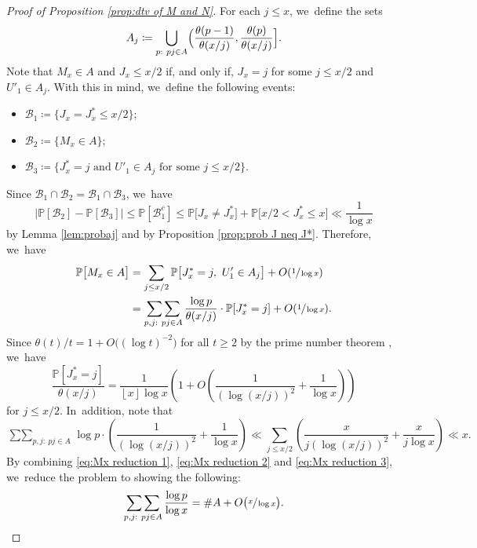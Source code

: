 \documentclass[JEP,XML,SOM,Unicode,published]{cedram}
\newcommand{\bigO}[1]{O(#1)}
\newcommand{\PP}{\mathbb{P}}
\newcommand{\BC}{\mathcal{B}}
\newcommand{\bigoo}[1]{O\!\left(#1 \right)}
\newcommand{\floor}[1]{\left\lfloor #1 \right\rfloor}
\newcommand{\bg}{\big}
\newcommand{\bgg}{\Big}
\theoremstyle{plain}
\theoremstyle{definition}
\begin{document}
\begin{proof}[Proof of Proposition \ref{prop:dtv of M and N}]
For each $j \le x$, we~define the sets
\[
A_j \coloneqq \bigcup_{\substack{p:\ pj \in A}} \Bigl(\frac{\theta(p-1)}{\theta(x/j)}, \frac{\theta(p)}{\theta(x/j)}\Bigr].
\]
Note that $M_x \in A$ and $J_x \le x/2$ if, and only if, $J_x=j$ for some $j\le x/2$ and $U'_1 \in A_j$. With this in mind, we~define the following events:
\begin{itemize}
\item $\mathcal B_1 \coloneqq \{J_x=J_x^* \le x/2\}$;
\item $\mathcal B_2 \coloneqq \{ M_x \in A\}$;
\item $\mathcal B_3 \coloneqq \{\mbox{$J_x^* = j$ and $U'_1 \in A_j$ for some $j\le x/2$}\}$.
\end{itemize}
Since $\mathcal B_1 \cap \mathcal B_2 = \mathcal B_1 \cap \mathcal B_3$, we~have
\[
\bgg|\PP[\BC_2] - \PP[\BC_3]\bgg| \le \PP[\BC_1^c] \le \PP\bg[J_x \ne J_x^*\bg] + \PP\bg[x/2< J_x^* \le x\bg] \ll \frac{1}{\log x}
\]
by Lemma \ref{lem:probaj} and by Proposition \ref{prop:prob J neq J*}. Therefore, we~have
\begin{equation}
\label{eq:Mx reduction 1}
\begin{aligned}
\PP\bg[M_x \in A\bg]
&= \sum_{j \le x/2} \PP\bg[J_x^* = j,\ U'_1 \in A_j\bg] + \bigO{\sfrac{1}{\log x}} \\
&= \mathop{\sum\sum}_{p,j:\ pj \in A} \frac{\log p}{\theta(x/j)}\cdot \PP[J_x^* = j] + \bigO{\sfrac{1}{\log x}}.
\end{aligned}
\end{equation}
Since $\theta(t)/t = 1 + O\bg((\log t)^{-2}\bg)$ for all $t \ge 2$ by the prime number theorem \cite[Th.\,8.1]{Koukoulo19}, we~have
\begin{equation}
\label{eq:Mx reduction 2}
\frac{\PP[J_x^* = j]}{\theta(x/j)} = \frac{1}{\floor x \log x}\left(1+\bigoo{\frac{1}{(\log(x/j))^2}+\frac{1}{\log x}}\right)
\end{equation}
for $j\le x/2$. In~addition, note that
\begin{equation}
\label{eq:Mx reduction 3}
\mathop{\sum\sum}_{p,j:\ pj \in A} \log p \cdot \left(\frac{1}{(\log(x/j))^2} + \frac{1}{\log x}\right) \ll \sum_{j \le x/2} \left(\frac{x}{j(\log(x/j))^2} + \frac{x}{j\log x}\right) \ll x.
\end{equation}
By combining \eqref{eq:Mx reduction 1}, \eqref{eq:Mx reduction 2} and \eqref{eq:Mx reduction 3}, we~reduce the problem to showing the following:
\begin{equation}
\label{eq:Mx reduction 4}
\mathop{\sum\sum}_{p,j:\ pj \in A} \frac{\log p}{\log x} = \# A + O\bg(\sfrac{x}{\log x}\bg).

\end{equation}
\end{proof}
\end{document}
